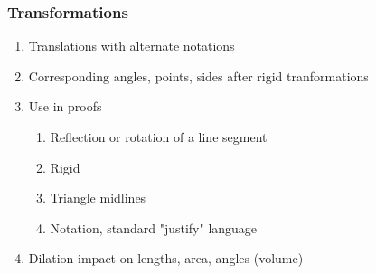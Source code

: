 \documentclass[12pt, twoside]{article}
\begin{document}
\subsubsection*{Transformations}
  \begin{enumerate}
  \item Translations with alternate notations
  \item Corresponding angles, points, sides after rigid tranformations
  \item Use in proofs
  \begin{enumerate}
    \item Reflection or rotation of a line segment
    \item Rigid
    \item Triangle midlines
    \item Notation, standard "justify" language
    \end{enumerate}
  \item Dilation impact on lengths, area, angles (volume)
  \end{enumerate}
\end{document}
